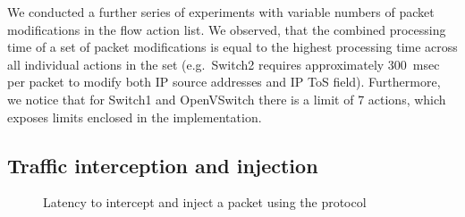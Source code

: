 We conducted a further series of experiments with variable numbers of packet
modifications in the flow action list. We observed, that the combined processing
time of a set of packet modifications is equal to the highest processing time
across all individual actions in the set (e.g.~Switch2 requires approximately
300~msec per packet to modify both IP source addresses and IP ToS field).
Furthermore, we notice that for Switch1 and OpenVSwitch there is a limit of 7
actions, which exposes limits enclosed in the implementation.

\subsection{Traffic interception and injection}\label{sec:results-pktin}

\begin{figure}[ht]
  \begin{center}
  \end{center}
  \caption{Latency to intercept and inject a packet using the \of protocol}
  \label{fig:pkt_in_out_delay}
\end{figure}

